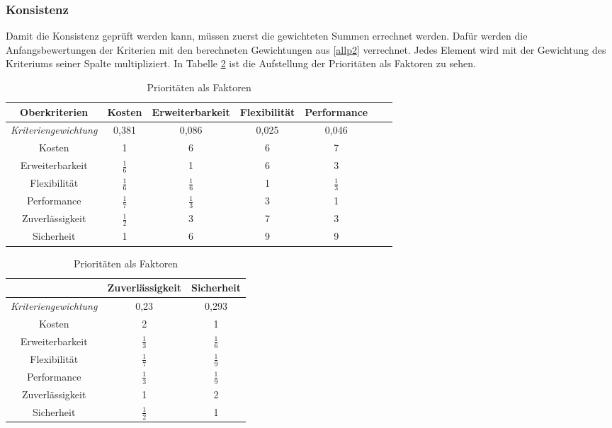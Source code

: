 \subsubsection{Konsistenz}
Damit die Konsistenz geprüft werden kann, müssen zuerst die gewichteten Summen errechnet werden. Dafür werden die Anfangsbewertungen der Kriterien mit den berechneten Gewichtungen aus \ref{allp2} verrechnet. Jedes Element wird mit der Gewichtung des Kriteriums seiner Spalte multipliziert. In Tabelle \ref{all3} ist die Aufstellung der Prioritäten als Faktoren zu sehen.
\begin{table}[h!]
	\centering
	\begin{tabular}{c|cccccc}
		Oberkriterien   & Kosten			 & Erweiterbarkeit & Flexibilität & Performance   \\ 
		\hline
\textit{Kriteriengewichtung}          & 0,381     		      &        0,086        &       0,025      &      0,046      \\
		Kosten          & 1     		      &        6        &       6      &      7      \\
		Erweiterbarkeit &   $\frac{1}{6}$     & 1               &       6      &      3      \\
		Flexibilität    &   $\frac{1}{6}$     &  $\frac{1}{6}$   & 1            &      $\frac{1}{3}$       \\
		Performance     &    $\frac{1}{7}$    &  $\frac{1}{3}$   &        3      & 1           \\
		Zuverlässigkeit &    $\frac{1}{2}$    &          3       &        7      &      3       \\
		Sicherheit      &    1   			  &        6         &        9      &       9             
	\end{tabular}
	\begin{tabular}{c|cc}
		&	Zuverlässigkeit & Sicherheit  \\ 
		\hline
		\textit{Kriteriengewichtung}         &        0,23        &        0,293    \\
		Kosten          &        2        &        1    \\
		Erweiterbarkeit &        $\frac{1}{3}$        &       $\frac{1}{6}$      \\
		Flexibilität    &        $\frac{1}{7}$         &      $\frac{1}{9}$       \\
		Performance     &        $\frac{1}{3}$         &      $\frac{1}{9}$       \\
		Zuverlässigkeit & 1               &      2       \\
		Sicherheit      &        $\frac{1}{2}$       & 1          
	\end{tabular}
	\caption{Prioritäten als Faktoren}
	\label{all3}
\end{table}\\
